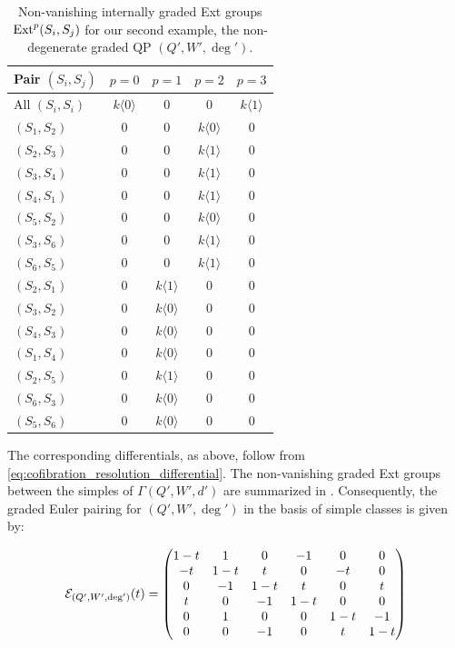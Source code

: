 \begin{table}[h]
\centering
\caption{Non-vanishing internally graded Ext groups $\operatorname{Ext}^p(S_i,S_j)$ for our second example, the non-degenerate graded QP $(Q',W',\deg')$.}
\label{table:Ext_groups2}
\begin{tabular}{@{}l c c c c@{}}
\toprule
Pair $(S_i, S_j)$ & $p=0$ & $p=1$ & $p=2$ & $p=3$ \\ 
\midrule
All $(S_i, S_i)$ & $k\langle 0 \rangle$ & 0 & 0 & $k\langle 1 \rangle$ \\
\addlinespace
$(S_1, S_2)$ & 0 & 0 & $k\langle 0 \rangle$ & 0 \\
$(S_2, S_3)$ & 0 & 0 & $k\langle 1 \rangle$ & 0 \\
$(S_3, S_4)$ & 0 & 0 & $k\langle 1 \rangle$ & 0 \\
$(S_4, S_1)$ & 0 & 0 & $k\langle 1 \rangle$ & 0 \\
$(S_5, S_2)$ & 0 & 0 & $k\langle 0 \rangle$ & 0 \\
$(S_3, S_6)$ & 0 & 0 & $k\langle 1 \rangle$ & 0 \\
$(S_6, S_5)$ & 0 & 0 & $k\langle 1 \rangle$ & 0 \\
\addlinespace
$(S_2, S_1)$ & 0 & $k\langle 1 \rangle$ & 0 & 0 \\
$(S_3, S_2)$ & 0 & $k\langle 0 \rangle$ & 0 & 0 \\
$(S_4, S_3)$ & 0 & $k\langle 0 \rangle$ & 0 & 0 \\
$(S_1, S_4)$ & 0 & $k\langle 0 \rangle$ & 0 & 0 \\
$(S_2, S_5)$ & 0 & $k\langle 1 \rangle$ & 0 & 0 \\
$(S_6, S_3)$ & 0 & $k\langle 0 \rangle$ & 0 & 0 \\
$(S_5, S_6)$ & 0 & $k\langle 0 \rangle$ & 0 & 0 \\
\bottomrule
\end{tabular}
\end{table}

The corresponding differentials, as above, follow from \eqref{eq:cofibration_resolution_differential}. The non-vanishing graded Ext groups between the simples of $\Gamma(Q',W',d')$ are summarized in . Consequently, the graded Euler pairing for $(Q',W',\deg')$ in the basis of simple classes is given by:

\[
\mathcal E_{(Q',W',\deg')}(t) = \begin{pmatrix} 
1 - t & 1 & 0 & -1 & 0 & 0 \\ 
-t & 1 - t & t & 0 & -t & 0 \\ 
0 & -1 & 1 - t & t & 0 & t \\ 
t & 0 & -1 & 1 - t & 0 & 0 \\
0 & 1 & 0 & 0 & 1 - t & -1 \\
0 & 0 & -1 & 0 & t & 1 - t
\end{pmatrix}
\]

